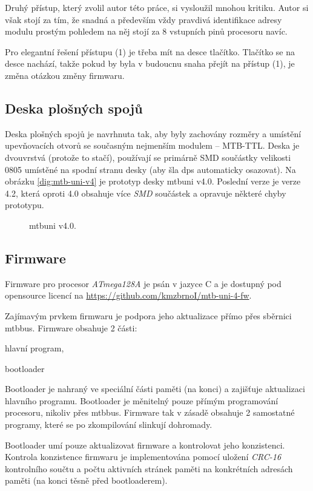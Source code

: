 Druhý přístup, který zvolil autor této práce, si vysloužil mnohou kritiku.
Autor si však stojí za tím, že snadná a především vždy pravdivá identifikace
adresy modulu prostým pohledem na něj stojí za 8 vstupních pinů procesoru navíc.

Pro elegantní řešení přístupu (1) je třeba mít na desce tlačítko. Tlačítko se
na desce nachází, takže pokud by byla v budoucnu snaha přejít na přístup (1),
je změna otázkou změny firmwaru.

\subsection{Deska plošných spojů}

Deska plošných spojů je navrhnuta tak, aby byly zachovány rozměry a umístění
upevňovacích otvorů se současným nejmenším modulem – MTB-TTL. Deska je dvouvrstvá
(protože to stačí), používají se primárně SMD součástky velikosti 0805 umístěné
na spodní stranu desky (aby šla \gls{dps} automaticky osazovat). Na obrázku
\ref{dig:mtb-uni-v4} je prototyp desky \gls{mtbuni} v4.0. Poslední verze je
verze 4.2, která oproti 4.0 obsahuje více \textit{SMD} součástek a opravuje
některé chyby prototypu.

\begin{figure}[ht]
\caption{\gls{mtbuni} v4.0.}
\label{fig:mtb-uni-v4}
\end{figure}

\subsection{Firmware}

Firmware pro procesor \textit{ATmega128A} je psán v jazyce C a je dostupný
pod opensource licencí na \url{https://github.com/kmzbrnoI/mtb-uni-4-fw}.

Zajímavým prvkem firmwaru je podpora jeho aktualizace přímo přes sběrnici
\gls{mtbbus}. Firmware obsahuje 2 části:

\begin{compactenum}
\item hlavní program,
\item bootloader
\end{compactenum}

Bootloader je nahraný ve speciální části paměti (na konci) a zajišťuje
aktualizaci hlavního programu. Bootloader je měnitelný pouze přímým
programování procesoru, nikoliv přes \gls{mtbbus}. Firmware tak v zásadě
obsahuje 2 samostatné programy, které se po zkompilování slinkují dohromady.

Bootloader umí pouze aktualizovat firmware a kontrolovat jeho konzistenci.
Kontrola konzistence firmwaru je implementována pomocí uložení \textit{CRC-16}
kontrolního součtu a počtu aktivních stránek paměti na konkrétních adresách
paměti (na konci těsně před bootloaderem).
